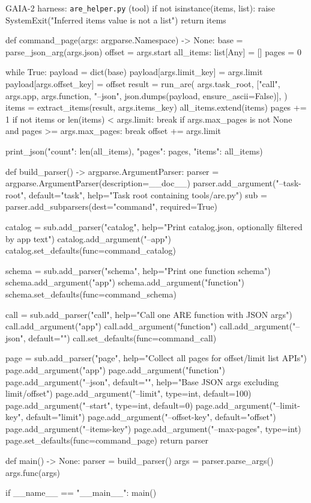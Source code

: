 \documentclass{llmxive}
\begin{document}
\begin{promptbox}{GAIA-2 harness: \texttt{are\_helper.py} (tool)}
    if not isinstance(items, list):
        raise SystemExit("Inferred items value is not a list")
    return items


def command_page(args: argparse.Namespace) -> None:
    base = parse_json_arg(args.json)
    offset = args.start
    all_items: list[Any] = []
    pages = 0

    while True:
        payload = dict(base)
        payload[args.limit_key] = args.limit
        payload[args.offset_key] = offset
        result = run_are(
            args.task_root,
            ["call", args.app, args.function, "--json", json.dumps(payload, ensure_ascii=False)],
        )
        items = extract_items(result, args.items_key)
        all_items.extend(items)
        pages += 1
        if not items or len(items) < args.limit:
            break
        if args.max_pages is not None and pages >= args.max_pages:
            break
        offset += args.limit

    print_json({"count": len(all_items), "pages": pages, "items": all_items})


def build_parser() -> argparse.ArgumentParser:
    parser = argparse.ArgumentParser(description=__doc__)
    parser.add_argument("--task-root", default="task", help="Task root containing tools/are.py")
    sub = parser.add_subparsers(dest="command", required=True)

    catalog = sub.add_parser("catalog", help="Print catalog.json, optionally filtered by app text")
    catalog.add_argument("--app")
    catalog.set_defaults(func=command_catalog)

    schema = sub.add_parser("schema", help="Print one function schema")
    schema.add_argument("app")
    schema.add_argument("function")
    schema.set_defaults(func=command_schema)

    call = sub.add_parser("call", help="Call one ARE function with JSON args")
    call.add_argument("app")
    call.add_argument("function")
    call.add_argument("--json", default="{}")
    call.set_defaults(func=command_call)

    page = sub.add_parser("page", help="Collect all pages for offset/limit list APIs")
    page.add_argument("app")
    page.add_argument("function")
    page.add_argument("--json", default="{}", help="Base JSON args excluding limit/offset")
    page.add_argument("--limit", type=int, default=100)
    page.add_argument("--start", type=int, default=0)
    page.add_argument("--limit-key", default="limit")
    page.add_argument("--offset-key", default="offset")
    page.add_argument("--items-key")
    page.add_argument("--max-pages", type=int)
    page.set_defaults(func=command_page)
    return parser


def main() -> None:
    parser = build_parser()
    args = parser.parse_args()
    args.func(args)


if __name__ == "__main__":
    main()
\end{promptbox}
\end{document}
